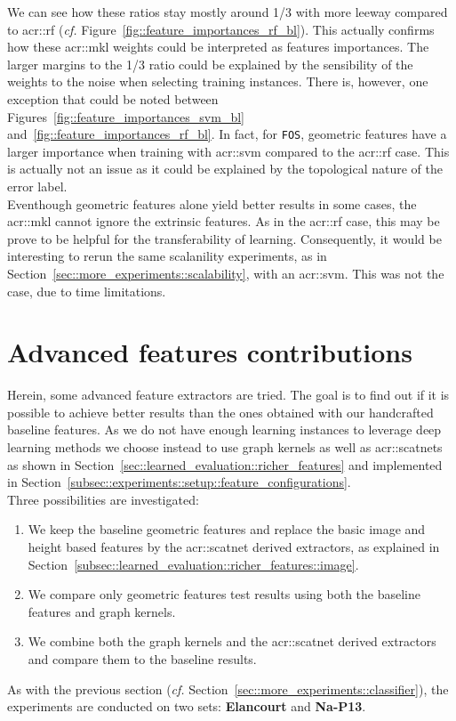         We can see how these ratios stay mostly around 1/3 with more leeway compared to \gls{acr::rf} (\textit{cf.} Figure~\ref{fig::feature_importances_rf_bl}).
        This actually confirms how these \gls{acr::mkl} weights could be interpreted as features importances.
        The larger margins to the 1/3 ratio could be explained by the sensibility of the weights to the noise when selecting training instances.
        There is, however, one exception that could be noted between Figures~\ref{fig::feature_importances_svm_bl} and~\ref{fig::feature_importances_rf_bl}.
        In fact, for \texttt{FOS}, geometric features have a larger importance when training with \gls{acr::svm} compared to the \gls{acr::rf} case.
        This is actually not an issue as it could be explained by the topological nature of the error label.\\

        Eventhough geometric features alone yield better results in some cases, the \gls{acr::mkl} cannot ignore the extrinsic features.
        As in the \gls{acr::rf} case, this may be prove to be helpful for the transferability of learning.
        Consequently, it would be interesting to rerun the same scalanility experiments, as in Section~\ref{sec::more_experiments::scalability}, with an \gls{acr::svm}.
        This was not the case, due to time limitations.
    
\section{Advanced features contributions}
    \label{sec::more_experiments::richer_features}
    Herein, some advanced feature extractors are tried.
    The goal is to find out if it is possible to achieve better results than the ones obtained with our handcrafted baseline features.
    As we do not have enough learning instances to leverage deep learning methods we choose instead to use graph kernels as well as \glspl{acr::scatnet} as shown in Section~\ref{sec::learned_evaluation::richer_features} and implemented in Section~\ref{subsec::experiments::setup::feature_configurations}.\\

    Three possibilities are investigated:
    \begin{enumerate}[label=\roman*)]
        \item We keep the baseline geometric features and replace the basic image and height based features by the \gls{acr::scatnet} derived extractors, as explained in Section~\ref{subsec::learned_evaluation::richer_features::image}.
        \item We compare only geometric features test results using both the baseline features and graph kernels.
        \item We combine both the graph kernels and the \gls{acr::scatnet} derived extractors and compare them to the baseline results.
    \end{enumerate}
    As with the previous section (\textit{cf.} Section~\ref{sec::more_experiments::classifier}), the experiments are conducted on two sets: \textbf{Elancourt} and \textbf{Na-P13}.

